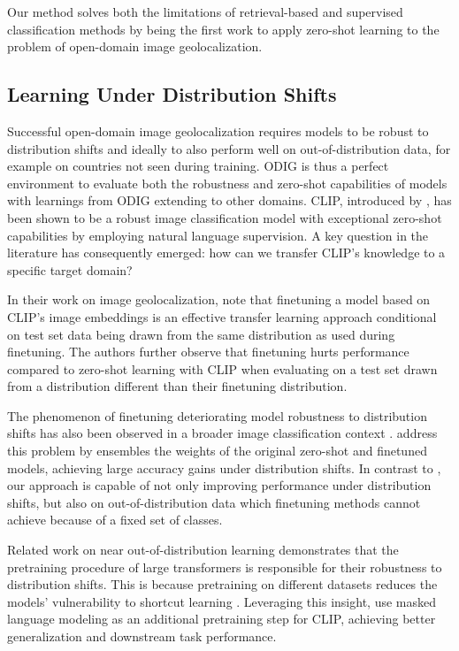 \documentclass{article}
\renewcommand{\cite}[1]{\citep{#1}}
\begin{document}
Our method solves both the limitations of retrieval-based and supervised classification methods by being the first work to apply zero-shot learning to the problem of open-domain image geolocalization.

\subsection{Learning Under Distribution Shifts} 

Successful open-domain image geolocalization requires models to be robust to distribution shifts and ideally to also perform well on out-of-distribution data, for example on countries not seen during training. ODIG is thus a perfect environment to evaluate both the robustness and zero-shot capabilities of models with learnings from ODIG extending to other domains. CLIP, introduced by \citet{radford21a}, has been shown to be a robust image classification model with exceptional zero-shot capabilities by employing natural language supervision. A key question in the literature has consequently emerged: how can we transfer CLIP's knowledge to a specific target domain?

In their work on image geolocalization, \citet{wu_huang_2022} note that finetuning a model based on CLIP's image embeddings is an effective transfer learning approach conditional on test set data being drawn from the same distribution as used during finetuning. The authors further observe that finetuning hurts performance compared to zero-shot learning with CLIP when evaluating on a test set drawn from a distribution different than their finetuning distribution.

The phenomenon of finetuning deteriorating model robustness to distribution shifts has also been observed in a broader image classification context \cite{Wortsman_2022_CVPR}. \citet{Wortsman_2022_CVPR} address this problem by ensembles the weights of the original zero-shot and finetuned models, achieving large accuracy gains under distribution shifts. In contrast to \citet{Wortsman_2022_CVPR}, our approach is capable of not only improving performance under distribution shifts, but also on out-of-distribution data which finetuning methods cannot achieve because of a fixed set of classes.

Related work on near out-of-distribution learning demonstrates that the pretraining procedure of large transformers is responsible for their robustness to distribution shifts. This is because pretraining on different datasets reduces the models' vulnerability to shortcut learning \cite{geirhos_2020, fort_2021}. Leveraging this insight, \citet{shen_2021} use masked language modeling as an additional pretraining step for CLIP, achieving better generalization and downstream task performance.
\end{document}
